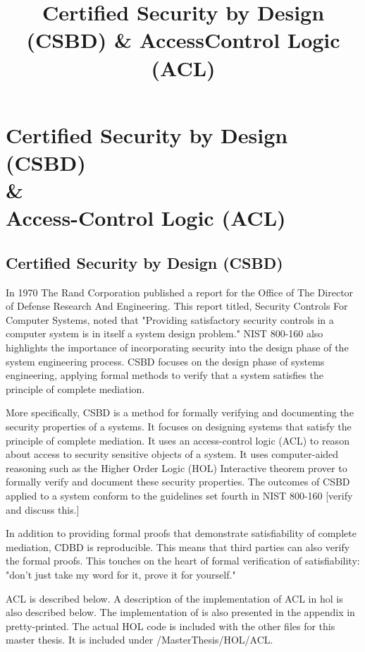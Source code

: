 \documentclass[../../main/main.tex]{subfiles}
\begin{document}
\title{Certified Security by Design (CSBD) \& Access\-Control Logic (ACL)}

\chapter[Certified Security by Design (CSBD) \& Access-Control Logic (ACL)]{Certified Security by Design (CSBD)  \\ \& \\ Access-Control Logic (ACL)} \label{chp:csbdacl}


\section{Certified Security by Design (CSBD)} \label{sec:csbd}
In 1970 The Rand Corporation published a report\cite{defensescienceboard} for the Office of The Director of Defense Research And Engineering.  This report titled, Security Controls For Computer Systems, noted that "Providing satisfactory security controls in a computer system is in itself a system design problem."  NIST 800-160 also highlights the importance of incorporating security into the design phase of the system engineering process.  CSBD focuses on the design phase of systems engineering, applying formal methods to verify that a system satisfies the principle of complete mediation.  

More specifically, CSBD is a method for formally verifying and documenting the security properties of a systems.  It focuses on designing systems that satisfy the principle of complete mediation.  It uses an access-control logic (ACL) to reason about access to security sensitive objects of a system.  It uses computer-aided reasoning such as the Higher Order Logic (HOL) Interactive theorem prover to formally verify and document these security properties.  The outcomes of CSBD applied to a system conform to the guidelines set fourth in NIST 800-160 [verify and discuss this.]

In addition to providing formal proofs that demonstrate satisfiability of complete mediation, CDBD is reproducible.  This means that third parties can also verify the formal proofs. This touches on the heart of formal verification of satisfiability: "don't just take my word for it, prove it for yourself."

ACL is described below.  A description of the implementation of ACL in \gls{hol} is also described below. The implementation of  is also presented in the appendix in pretty-printed.  The actual HOL code is included with the other files for this master thesis.  It is included under /MasterThesis/HOL/ACL.
\end{document}
